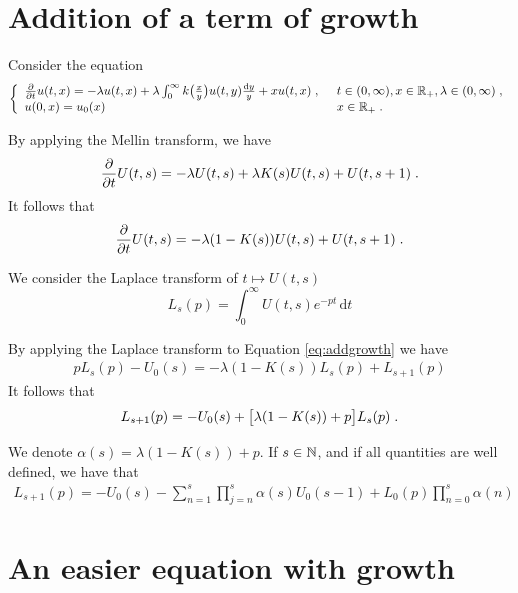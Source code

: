\documentclass[11pt]{amsart}
\newcommand{\diff}{\,\mathrm{d}}
\begin{document}
\section{Addition of a term of growth}

Consider the equation
\begin{equation*}\left\{
    \begin{array}{ll}
	\frac{\partial}{\partial t}u(t,x) = - \lambda u(t,x) + \lambda \int_{0}^{\infty} k\big( \frac{x}{y}\big)u(t,y) \frac{\mathrm dy}{y} + xu(t,x)
	\; , \enspace
	& t \in (0, \infty), x \in \mathbb{R}_+, \lambda \in (0, \infty) \; ,
	\\
	u(0, x) = u_0(x)
	& x \in \mathbb{R}_+
	\; .
    \end{array}
	\right.
\end{equation*}

By applying the Mellin transform, we have
	\begin{equation*}
		\frac{\partial}{\partial t} U(t,s) = - \lambda U(t,s) + \lambda K(s) U(t,s) + U(t,s+1)
		\; .
	\end{equation*}
It follows that
    \begin{equation}
        \frac{\partial}{\partial t} U(t,s) = - \lambda (1-K(s)) U(t,s) + U(t,s+1)
		\; .
        \label{eq:addgrowth}
    \end{equation}

We consider the Laplace transform of $t \mapsto U(t,s)$
$$ L_s(p) = \int_0^\infty U(t,s)e^{-pt}\diff t$$ 

By applying the Laplace transform to Equation \eqref{eq:addgrowth} we have 
\begin{align*}
    pL_s(p) - U_0(s) = -  \lambda (1-K(s)) L_s(p) + L_{s+1}(p)
\end{align*}
It follows that 
\begin{align*}
    L_{s+1}(p) = - U_0(s) + \big[\lambda (1-K(s)) + p \big]L_s(p)
    \; .
\end{align*}

\begin{remark}
We denote $\alpha(s) = \lambda (1-K(s)) + p$. If $s \in \mathbb{N}$, and if all quantities are well defined, we have that
\begin{align*}
    L_{s+1}(p) = -U_0(s) -\sum_{n = 1}^{s} \prod_{j = n}^s \alpha(s)U_0(s-1) + L_0(p) \prod_{n = 0}^{s}\alpha(n)
\end{align*}
\end{remark}



\section{An easier equation with growth}
\end{document}
